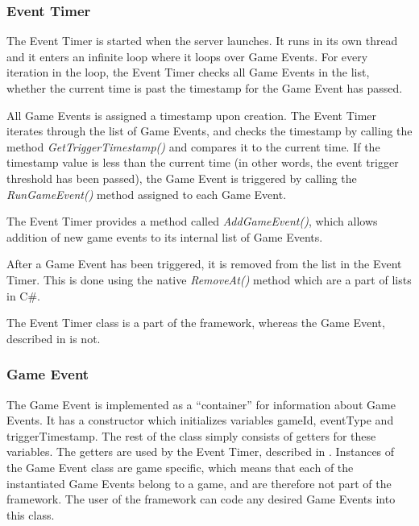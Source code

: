 \subsubsection{Event Timer}
\label{sec:eventtimerimpl}
The Event Timer is started when the server launches. It runs in its own thread and it enters an infinite loop where it loops over Game Events. For every iteration in the loop, the Event Timer checks all Game Events in the list, whether the current time is past the timestamp for the Game Event has passed. 

All Game Events is assigned a timestamp upon creation. The Event Timer iterates through the list of Game Events, and checks the timestamp by calling the method \textit{GetTriggerTimestamp()} and compares it to the current time. If the timestamp value is less than the current time (in other words, the event trigger threshold has been passed), the Game Event is triggered by calling the \textit{RunGameEvent()} method assigned to each Game Event. 

The Event Timer provides a method called \textit{AddGameEvent()}, which allows addition of new game events to its internal list of Game Events.

After a Game Event has been triggered, it is removed from the list in the Event Timer. This is done using the native \textit{RemoveAt()} method which are a part of lists in C\#.

The Event Timer class is a part of the framework, whereas the Game Event, described in  is not.

\subsubsection{Game Event}\label{subsec:geventImpl}
The Game Event is implemented as a ``container'' for information about Game Events. It has a constructor which initializes variables gameId, eventType and triggerTimestamp. The rest of the class simply consists of getters for these variables. The getters are used by the Event Timer, described in . Instances of the Game Event class are game specific, which means that each of the instantiated Game Events belong to a game, and are therefore not part of the framework. The user of the framework can code any desired Game Events into this class.
